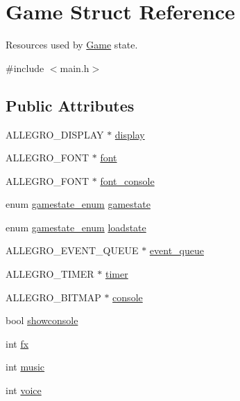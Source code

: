 \hypertarget{structGame}{\section{Game Struct Reference}
\label{structGame}
}


Resources used by \hyperlink{structGame}{Game} state.  




{\ttfamily \#include $<$main.\-h$>$}

\subsection*{Public Attributes}
\begin{DoxyCompactItemize}
\item 
A\-L\-L\-E\-G\-R\-O\-\_\-\-D\-I\-S\-P\-L\-A\-Y $\ast$ \hyperlink{structGame_a2bf8ece79fe05b03c31f2e2ede42e5f5}{display}
\item 
A\-L\-L\-E\-G\-R\-O\-\_\-\-F\-O\-N\-T $\ast$ \hyperlink{structGame_a455bfdaacd5f2bda80b640c02ec3250e}{font}
\item 
A\-L\-L\-E\-G\-R\-O\-\_\-\-F\-O\-N\-T $\ast$ \hyperlink{structGame_a692f2c3ec0f3e956aa8bdac00a864bf8}{font\-\_\-console}
\item 
enum \hyperlink{main_8h_ae1e9f94402d151ae1adc212237a6d153}{gamestate\-\_\-enum} \hyperlink{structGame_a5118a01ee6bb74fb41e8e8880a5b85a2}{gamestate}
\item 
enum \hyperlink{main_8h_ae1e9f94402d151ae1adc212237a6d153}{gamestate\-\_\-enum} \hyperlink{structGame_a026bb8ebb6454c0d87dea503eafa9197}{loadstate}
\item 
A\-L\-L\-E\-G\-R\-O\-\_\-\-E\-V\-E\-N\-T\-\_\-\-Q\-U\-E\-U\-E $\ast$ \hyperlink{structGame_a820782e408ff7a704dc12af67eb0c44f}{event\-\_\-queue}
\item 
A\-L\-L\-E\-G\-R\-O\-\_\-\-T\-I\-M\-E\-R $\ast$ \hyperlink{structGame_a8d6d4f06c6412d085112cd007977d868}{timer}
\item 
A\-L\-L\-E\-G\-R\-O\-\_\-\-B\-I\-T\-M\-A\-P $\ast$ \hyperlink{structGame_aa2e3d0922374dc870a1aeabf9e3b8ae2}{console}
\item 
bool \hyperlink{structGame_ab1dafa4ce0c3526439418ac24bf616d8}{showconsole}
\item 
int \hyperlink{structGame_a10c0e81918f42e7367b4590e6885048e}{fx}
\item 
int \hyperlink{structGame_aa8eff7d132a51e5ca97a376433790426}{music}
\item 
int \hyperlink{structGame_a5523ac4fdb8fdbd2e86b58a3fbc2e6d0}{voice}

\end{DoxyCompactItemize}
